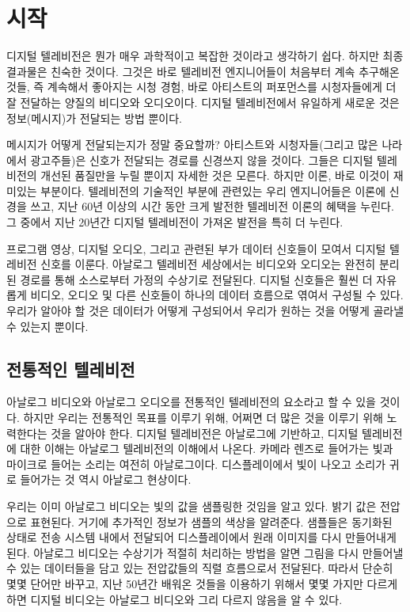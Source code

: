 \chapter{시작}
디지털 텔레비전은 뭔가 매우 과학적이고 복잡한 것이라고 생각하기 쉽다. 하지만 최종 결과물은 친숙한 것이다.
그것은 바로 텔레비전 엔지니어들이 처음부터 계속 추구해온 것들, 즉 계속해서 좋아지는 시청 경험, 바로 아티스트의 퍼포먼스를 시청자들에게 더 잘 전달하는 양질의 비디오와 오디오이다.
디지털 텔레비전에서 유일하게 새로운 것은 정보(메시지)가 전달되는 방법 뿐이다.

메시지가 어떻게 전달되는지가 정말 중요할까? 아티스트와 시청자들(그리고 많은 나라에서 광고주들)은 신호가 전달되는 경로를 신경쓰지 않을 것이다.
그들은 디지털 텔레비전의 개선된 품질만을 누릴 뿐이지 자세한 것은 모른다. 하지만 이론, 바로 이것이 재미있는 부분이다.
텔레비전의 기술적인 부분에 관련있는 우리 엔지니어들은 이론에 신경을 쓰고, 지난 60년 이상의 시간 동안 크게 발전한 텔레비전 이론의 혜택을 누린다.
그 중에서 지난 20년간 디지털 텔레비전이 가져온 발전을 특히 더 누린다.

프로그램 영상, 디지털 오디오, 그리고 관련된 부가 데이터 신호들이 모여서 디지털 텔레비전 신호를 이룬다.
아날로그 텔레비전 세상에서는 비디오와 오디오는 완전히 분리된 경로를 통해 소스로부터 가정의 수상기로 전달된다.
디지털 신호들은 훨씬 더 자유롭게 비디오, 오디오 및 다른 신호들이 하나의 데이터 흐름으로 엮여서 구성될 수 있다.
우리가 알아야 할 것은 데이터가 어떻게 구성되어서 우리가 원하는 것을 어떻게 골라낼 수 있는지 뿐이다.

\section{전통적인 텔레비전}
아날로그 비디오와 아날로그 오디오를 전통적인 텔레비전의 요소라고 할 수 있을 것이다. 하지만 우리는 전통적인 목표를 이루기 위해, 어쩌면 더 많은 것을 이루기 위해 노력한다는 것을 알아야 한다.
디지털 텔레비전은 아날로그에 기반하고, 디지털 텔레비전에 대한 이해는 아날로그 텔레비전의 이해에서 나온다.
카메라 렌즈로 들어가는 빛과 마이크로 들어는 소리는 여전히 아날로그이다. 디스플레이에서 빛이 나오고 소리가 귀로 들어가는 것 역시 아날로그 현상이다.

우리는 이미 아날로그 비디오는 빛의 값을 샘플링한 것임을 알고 있다. 밝기 값은 전압으로 표현된다. 거기에 추가적인 정보가 샘플의 색상을 알려준다.
샘플들은 동기화된 상태로 전송 시스템 내에서 전달되어 디스플레이에서 원래 이미지를 다시 만들어내게 된다.
아날로그 비디오는 수상기가 적절히 처리하는 방법을 알면 그림을 다시 만들어낼 수 있는 데이터들을 담고 있는 전압값들의 직렬 흐름으로서 전달된다.
따라서 단순히 몇몇 단어만 바꾸고, 지난 50년간 배워온 것들을 이용하기 위해서 몇몇 가지만 다르게 하면 디지털 비디오는 아날로그 비디오와 그리 다르지 않음을 알 수 있다.

